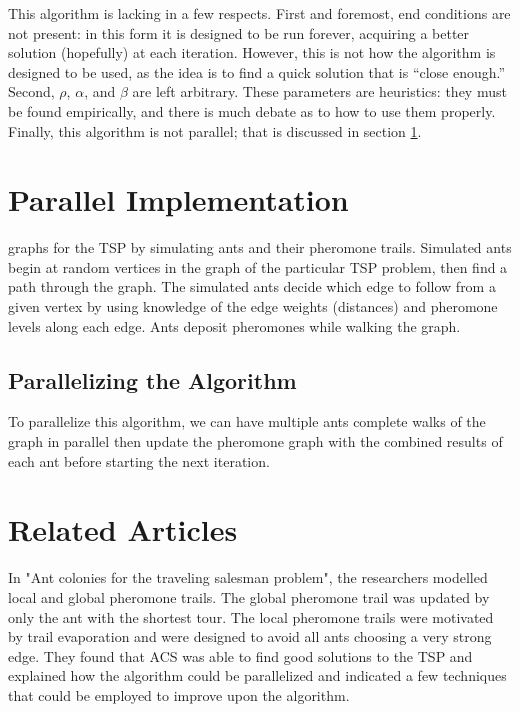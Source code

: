 \documentclass[twocolumn]{article}
\begin{document}
This algorithm is lacking in a few respects. First and foremost, end conditions are not present:
in this form it is designed to be run forever, acquiring a better solution (hopefully) at each
iteration. However, this is not how the algorithm is designed to be used, as the idea is to find
a quick solution that is ``close enough.'' Second, $\rho$, $\alpha$, and $\beta$ are left 
arbitrary. These parameters are heuristics: they must be found empirically, and there is much 
debate as to how to use them properly. Finally, this algorithm is not parallel; that is 
discussed in section \ref{sec:parallel}.


\section{Parallel Implementation} \label{sec:parallel}
graphs for the TSP by simulating ants and their pheromone trails. Simulated ants
begin at random vertices in the graph of the particular TSP problem, then find a
path through the graph. The simulated ants decide which edge to follow from a
given vertex by using knowledge of the edge weights (distances) and pheromone
levels along each edge. Ants deposit pheromones while walking the graph. \\


\subsection{Parallelizing the Algorithm}

To parallelize this algorithm, we can have multiple ants complete walks of the
graph in parallel then update the pheromone graph with the combined results of
each ant before starting the next iteration.  \\


\section{Related Articles}

In "Ant colonies for the traveling salesman problem", the researchers modelled 
local and global pheromone trails. The global pheromone trail was updated by 
only the ant with the shortest tour. The local pheromone trails were motivated 
by trail evaporation and were designed to avoid all ants choosing a very strong 
edge. They found that ACS was able to find good solutions to the TSP and 
explained how the algorithm could be parallelized and indicated a few techniques
that could be employed to improve upon the algorithm. \\
\end{document}
